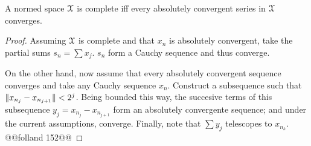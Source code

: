\begin{teorema}
    A normed space $\EuScript{X}$ is complete iff every absolutely convergent series in $\EuScript{X}$ converges.
    \begin{proof}
       Assuming $\EuScript{X}$ is complete and that $x_n$ is absolutely convergent, take the partial sums $s_n=\sum x_j$. $s_n$ form a Cauchy sequence and thus converge.

       On the other hand, now assume that every absolutely convergent sequence converges and take any Cauchy sequence $x_n$. Construct a  subsequence such that $\Vert x_{n_j} - x_{n_{j+1}}\Vert < 2^{j}$. Being bounded this way, the succesive terms of this subsequence $y_j=x_{n_j} - x_{n_{j+1}}$ form an absolutely convergente sequence; and under the current assumptions, converge. Finally, note that $\sum y_j$ telescopes to $x_{n_k}$.
        @@folland 152@@
    \end{proof}
\end{teorema}
